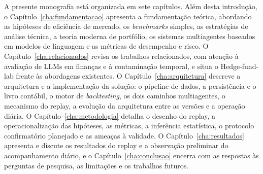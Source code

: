 A presente monografia está organizada em sete capítulos. Além desta introdução, o Capítulo~\ref{cha:fundamentacao} apresenta a fundamentação teórica, abordando as hipóteses de eficiência de mercado, os \textit{benchmarks} simples, as estratégias de análise técnica, a teoria moderna de portfólio, os sistemas multiagentes baseados em modelos de linguagem e as métricas de desempenho e risco. O Capítulo~\ref{cha:relacionados} revisa os trabalhos relacionados, com atenção à avaliação de LLMs em finanças e à contaminação temporal, e situa o Hedge-fund-lab frente às abordagens existentes. O Capítulo~\ref{cha:arquitetura} descreve a arquitetura e a implementação da solução: o pipeline de dados, a persistência e o livro contábil, o motor de \textit{backtesting}, os dois caminhos multiagentes, o mecanismo do replay, a evolução da arquitetura entre as versões e a operação diária. O Capítulo~\ref{cha:metodologia} detalha o desenho do replay, a operacionalização das hipóteses, as métricas, a inferência estatística, o protocolo confirmatório planejado e as ameaças à validade. O Capítulo~\ref{cha:resultados} apresenta e discute os resultados do replay e a observação preliminar do acompanhamento diário, e o Capítulo~\ref{cha:conclusao} encerra com as respostas às perguntas de pesquisa, as limitações e os trabalhos futuros.
